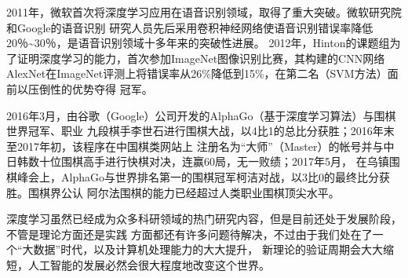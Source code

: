   2011年，微软\zs 首次将深度\zs 学习应用在语音识别\zs 领域，取得了重大\zs 突破。微软研\zs 究院和Goo\zs gle的语音识别
  研究\zs 人员先后采用卷积\zs 神经网络使语音\zs 识别错误率降低20％\textasciitilde30％，是语音\zs 识别领域十多\zs 年来的突破性进展。
  20\zs 12年，Hin\zs ton的课题组\zs 为了证明\zs 深度学习的能力，首次参\zs 加ImageNet图像\zs 识别比赛，其构建\zs 的CNN网络
  AlexNet在ImageNet评测上将错误率从26\%降低到15\%，在第二名（SVM方法）面前以压倒性的优势夺得
  冠军。


  2016\zs 年3月，由谷\zs 歌（Googl\zs e）公司开发的Alp\zs haGo（基于深度\zs 学习算法）与围棋世\zs 界冠军、职业
  九段\zs 棋手李世石进行围\zs 棋大战，以4比\zs 1的总比分获胜；2016年\zs 末至2017年初，该程序\zs 在中国棋类网站上
  注册\zs 名为“大师”（Ma\zs ster）的帐号并与中日\zs 韩数十位围棋高\zs 手进行快棋对决，连赢60局，\zs 无一败绩；20\zs 17年5月，
  在乌\zs 镇围棋峰会上，Alph\zs aGo与世界排\zs 名第一的围棋冠军\zs 柯洁对战，以3比0\zs 的最终比分获胜。围棋\zs 界公认
  阿尔\zs 法围棋的能力已\zs 经超过人类职业围棋顶\zs 尖水平。

  深度学习虽然已经成为众多科研领域的热门研究内容，但是目前还处于发展阶段，不管是理论方面还是实践
  方面都还有许多问题待解决，不过由于我们处在了一个“大数据”时代，以及计算机处理能力的大大提升，
  新理论的验证周期会大大缩短，人工智能的发展必然会很大程度地改变这个世界。
